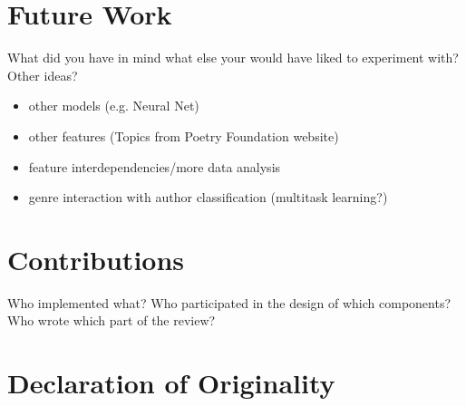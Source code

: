 \documentclass[11pt]{article}
\begin{document}
\section{Future Work}

What did you have in mind what else your
would have liked to experiment with? Other ideas?
\begin{itemize}
\item other models (e.g. Neural Net)
\item other features (Topics from Poetry Foundation website)
\item feature interdependencies/more data analysis
\item genre interaction with author classification (multitask learning?)
\end{itemize}





\appendix

\section{Contributions}
Who implemented what?
Who participated in the design of which components?
Who wrote which part of the review?
\section{Declaration of Originality}
\label{sec:appendix}
\end{document}
